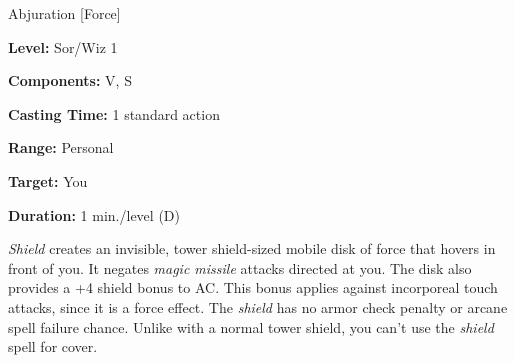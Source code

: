 
Abjuration [Force]

\textbf{Level:} Sor/Wiz 1

\textbf{Components:} V, S

\textbf{Casting Time:} 1 standard action

\textbf{Range:} Personal

\textbf{Target:} You

\textbf{Duration:} 1 min./level (D)

\textit{Shield} creates an invisible, tower shield-sized mobile disk of force that 
hovers in front of you. It negates \textit{magic missile} attacks directed at you. 
The disk also provides a +4 shield bonus to AC. This bonus applies against incorporeal 
touch attacks, since it is a force effect. The \textit{shield} has no armor check 
penalty or arcane spell failure chance. Unlike with a normal tower shield, you 
can't use the \textit{shield} spell for cover.

